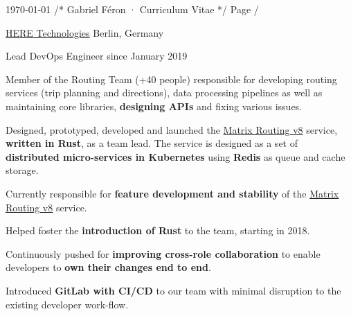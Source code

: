 \documentclass[10pt, a4paper]{awesome-cv}
\begin{document}
\raggedright

\makecvheader

\makecvfooter
{\today}
{/* Gabriel Féron · Curriculum Vitae */}
{Page \thepage /\pageref{LastPage}}

\begin{cventries}
	\cventrytitle
	{\href{https://developer.here.com}{HERE Technologies}}
	{Berlin, Germany}

	\cventry
	{Lead DevOps Engineer}
	{since January 2019}
	{
		\begin{cvparagraph}
			Member of the Routing Team (+40 people) responsible for developing routing services (trip planning and directions), data processing pipelines as well as maintaining core libraries, \textbf{designing APIs} and fixing various issues.
		\end{cvparagraph}
		\begin{cvitems}
			\item {Designed, prototyped, developed and launched the \href{https://developer.here.com/documentation/large-matrix/api-reference-swagger.html}{Matrix Routing v8} service, \textbf{written in Rust}, as a team lead.
			            The service is designed as a set of \textbf{distributed micro-services in Kubernetes} using \textbf{Redis} as queue and cache storage.}
			\item {Currently responsible for \textbf{feature development and stability} of the \href{https://developer.here.com/documentation/large-matrix/api-reference-swagger.html}{Matrix Routing v8} service.}
			\item {Helped foster the \textbf{introduction of Rust} to the team, starting in 2018.}
			\item {Continuously pushed for \textbf{improving cross-role collaboration} to enable developers to \textbf{own their changes end to end}.}
			\item {Introduced \textbf{GitLab with CI/CD} to our team with minimal disruption to the existing developer work-flow.}
		\end{cvitems}
	}


\end{cventries}
\end{document}
